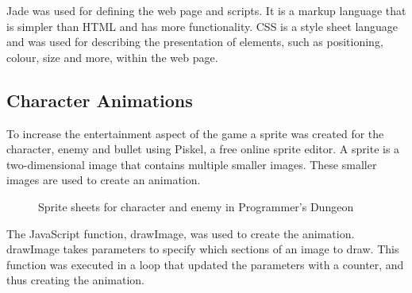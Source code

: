 \documentclass[a4paper,11.5pt]{report}
\numberwithin{figure}{section}
\numberwithin{table}{section}
\numberwithin{equation}{section}
\numberwithin{equation}{section}
\begin{document}
Jade was used for defining the web page and scripts. It is a markup language that is simpler than HTML and has more functionality. CSS is a style sheet language and was used for describing the presentation of elements, such as positioning, colour, size and more, within the web page.

\subsection{Character Animations}

To increase the entertainment aspect of the game a sprite was created for the character, enemy and bullet using Piskel, a free online sprite editor. A sprite is a two-dimensional image that contains multiple smaller images. These smaller images are used to create an animation. 


\begin{figure}[h]
  \caption{Sprite sheets for character and enemy in Programmer's Dungeon}\label{fig:sprite}
\end{figure}

The JavaScript function, drawImage, was used to create the animation. drawImage takes parameters to specify which sections of an image to draw. This function was executed in a loop that updated the parameters with a counter, and thus creating the animation.
\end{document}
